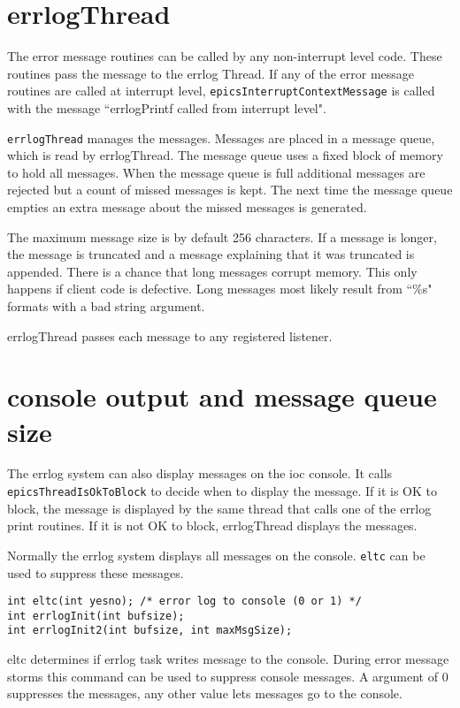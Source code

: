 \section{errlogThread}

The error message routines can be called by any non-interrupt level code.
These routines pass the message to the errlog Thread.
If any of the error message routines are called at interrupt level, \verb|epicsInterruptContextMessage| is called with the message ``errlogPrintf called from interrupt level".

\verb|errlogThread| manages the messages.
Messages are placed in a message queue, which is read by errlogThread.
The message queue uses a fixed block of memory to hold all messages.
When the message queue is full additional messages are rejected but a count of missed messages is kept.
The next time the message queue empties an extra message about the missed messages is generated.

The maximum message size is by default 256 characters.
If a message is longer, the message is truncated and a message explaining that it was truncated is appended.
There is a chance that long messages corrupt memory.
This only happens if client code is defective.
Long messages most likely result from ``\%s" formats with a bad string argument.

errlogThread passes each message to any registered listener.

\section{console output and message queue size}

The errlog system can also display messages on the ioc console.
It calls \verb|epicsThreadIsOkToBlock| to decide when to display the message.
If it is OK to block, the message is displayed by the same thread that calls one of the errlog print routines.
If it is not OK to block, errlogThread displays the messages.

Normally the errlog system displays all messages on the console.
\verb|eltc| can be used to suppress these messages.

\begin{verbatim}
int eltc(int yesno); /* error log to console (0 or 1) */
int errlogInit(int bufsize);
int errlogInit2(int bufsize, int maxMsgSize);
\end{verbatim}

eltc determines if errlog task writes message to the console.
During error message storms this command can be used to suppress console messages.
A argument of 0 suppresses the messages, any other value lets messages go to the console.

